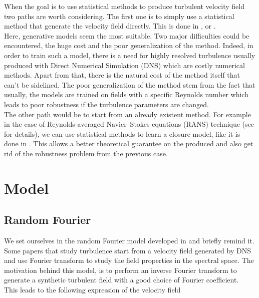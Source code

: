\documentclass[a4paper,12pt]{article}
\theoremstyle{definition}
\begin{document}

\bigskip

When the goal is to use statistical methods to produce turbulent velocity field two paths are worth considering. The first one is to simply use a statistical method that generate the velocity field directly. This is done in \cite{Yousif_Yu_Lim_2022},\cite{wang2025fourierflowfrequencyawareflowmatching} or \cite{parikh2025conditionalflowmatchinggenerative}. \\
Here, generative models seem the most suitable. Two major difficulties could be encountered, the huge cost and the poor generalization of the method. Indeed, in order to train such a model, there is a need for highly resolved turbulence usually produced with Direct Numerical Simulation (DNS) which are costly numerical methods. Apart from that, there is the natural cost of the method itself that can't be sidelined. The poor generalization of the method stem from the fact that usually, the models are trained on fields with a specific Reynolds number which leads to poor robustness if the turbulence parameters are changed. \\
The other path would be to start from an already existent method. For example in the case of Reynolds-averaged Navier–Stokes equations (RANS) technique (see \cite{} for details), we can use statistical methods to learn a closure model, like it is done in \cite{Bezgin2021}. This allows a better theoretical guarantee on the produced and also get rid of the robustness problem from the previous case.  


\section{Model}

\subsection{Random Fourier}

We set ourselves in the random Fourier model developed in \cite{Janin2021} and briefly remind it. 
Some papers that study turbulence start from a velocity field generated by DNS and use Fourier transform to study the field properties in the spectral space. The motivation behind this model, is to perform an inverse Fourier transform to generate a synthetic turbulent field with a good choice of Fourier coefficient. \\
This leads to the following expression of the velocity field 
\end{document}
